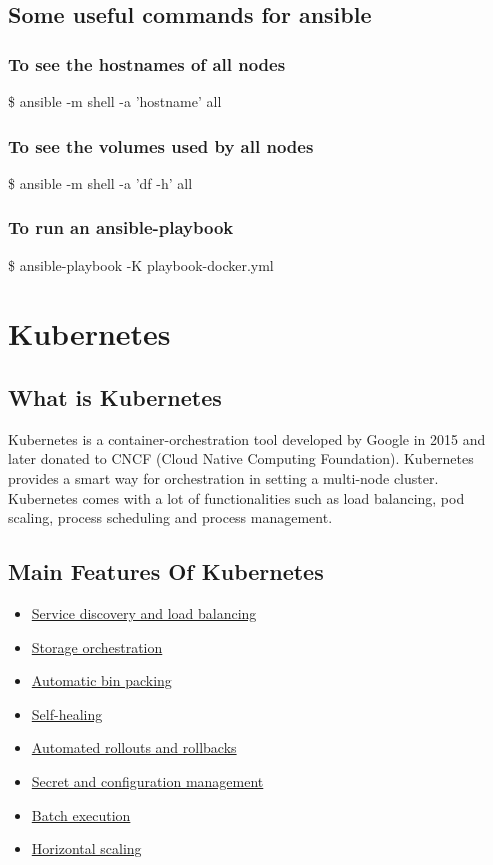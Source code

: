 \documentclass[12pt]{article}
\begin{document}
\subsection{Some useful commands for ansible}
\subsubsection{To see the hostnames of all nodes}
\$ ansible -m shell -a 'hostname' all
\subsubsection{To see the volumes used by all nodes}
\$ ansible -m shell -a 'df -h' all
\subsubsection{To run an ansible-playbook}
\$ ansible-playbook  -K playbook-docker.yml
\section{Kubernetes\cite{Kubernetes}}
\subsection{What is Kubernetes}
Kubernetes is a container-orchestration tool developed by Google in 2015 and later donated to CNCF (Cloud Native Computing Foundation). Kubernetes provides a smart way for orchestration in setting a multi-node cluster. Kubernetes comes with a lot of functionalities such as load balancing, pod scaling, process scheduling and process management.
\subsection{Main Features Of Kubernetes}
\begin{itemize}
	\item \href{https://kubernetes.io/docs/concepts/services-networking/service/}{Service discovery and load balancing}
	\item \href{https://kubernetes.io/docs/concepts/storage/persistent-volumes/}{Storage orchestration}
	\item \href{https://kubernetes.io/docs/concepts/configuration/manage-compute-resources-container/}{Automatic bin packing}
	\item \href{https://kubernetes.io/docs/concepts/workloads/controllers/replicationcontroller/#how-a-replicationcontroller-works}{Self-healing}
	\item \href{https://kubernetes.io/docs/concepts/workloads/controllers/deployment/}{Automated rollouts and rollbacks}
	\item \href{https://kubernetes.io/docs/concepts/configuration/secret/}{Secret and configuration management}
	\item \href{https://kubernetes.io/docs/concepts/workloads/controllers/jobs-run-to-completion/}{Batch execution}
	\item \href{https://kubernetes.io/docs/tasks/run-application/horizontal-pod-autoscale/}{Horizontal scaling}
\end{itemize}
\end{document}
